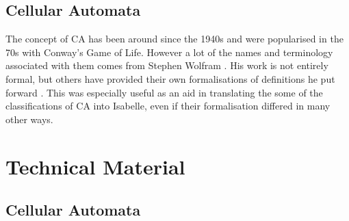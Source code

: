 \subsection{Cellular Automata}
The concept of CA has been around since the 1940s and were popularised in the 70s with Conway's Game of Life.
However a lot of the names and terminology associated with them comes from Stephen Wolfram \cite{wolfram}.
His work is not entirely formal,
but others have provided their own formalisations of definitions he put forward \cite{yu}.
This was especially useful as an aid in translating the some of the classifications of CA into Isabelle, 
even if their formalisation differed in many other ways.


\section{Technical Material}

\subsection{Cellular Automata}

